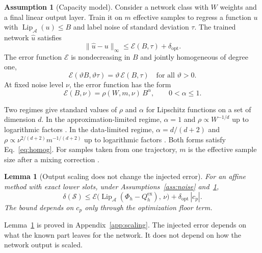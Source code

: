 \documentclass[11pt]{article}
\newtheorem{lemma}{Lemma}
\theoremstyle{definition}
\newtheorem{assumption}{Assumption}
\theoremstyle{remark}
\newcommand{\Aset}{\mathcal{A}}          %
\newcommand{\Meth}{\mathcal{S}}          %
\newcommand{\Err}{\mathcal{E}}           %
\newcommand{\Lip}{\operatorname{Lip}_{\Aset}}
\newcommand{\supA}[1]{\|#1\|_{\infty}}
\newcommand{\ex}{\mathrm{ex}}
\begin{document}
\begin{assumption}[Capacity model]\label{ass:capacity}
Consider a network class with $W$ weights and a final linear output layer.
Train it on $m$ effective samples to regress a function $u$ with $\Lip(u) \le B$ and label noise of standard deviation $\tau$.
The trained network $\hat u$ satisfies
\begin{equation}\label{eq:capacity}
\supA{\hat u - u} \le \Err(B, \tau) + \delta_{\mathrm{opt}}.
\end{equation}
The error function $\Err$ is nondecreasing in $B$ and jointly homogeneous of degree one,
\begin{equation}\label{eq:homog}
\Err(\vartheta B, \vartheta \tau) = \vartheta\, \Err(B, \tau) \quad \text{for all } \vartheta > 0.
\end{equation}
At fixed noise level $\nu$, the error function has the form
\begin{equation}\label{eq:rate}
\Err(B, \nu) = \rho(W, m, \nu)\, B^{\alpha}, \qquad 0 < \alpha \le 1.
\end{equation}
\end{assumption}

Two regimes give standard values of $\rho$ and $\alpha$ for Lipschitz functions on a set of dimension $d$.
In the approximation-limited regime, $\alpha = 1$ and $\rho \propto W^{-1/d}$ up to logarithmic factors \cite{yarotsky2017}.
In the data-limited regime, $\alpha = d/(d+2)$ and $\rho \propto \nu^{2/(d+2)} m^{-1/(d+2)}$ up to logarithmic factors \cite{stone1982}.
Both forms satisfy Eq.~\eqref{eq:homog}.
For samples taken from one trajectory, $m$ is the effective sample size after a mixing correction \cite{mohri2008}.

\begin{lemma}[Output scaling does not change the injected error]\label{lem:scaling}
For an affine method with exact lower slots, under Assumptions~\ref{ass:noise} and~\ref{ass:capacity},
\begin{equation}\label{eq:scaling}
\delta(\Meth) \le \Err\big(\Lip(\Phi_h - Q_h^\ex),\, \nu\big) + \delta_{\mathrm{opt}}\,|c_p|.
\end{equation}
The bound depends on $c_p$ only through the optimization floor term.
\end{lemma}

Lemma~\ref{lem:scaling} is proved in Appendix~\ref{app:scaling}.
The injected error depends on what the known part leaves for the network.
It does not depend on how the network output is scaled.
\end{document}
